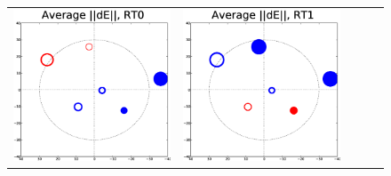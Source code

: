 \documentclass[]{aa}
\begin{document}

\begin{figure}
\centering
\begin{tabular}{@{}c@{}c@{}c@{}c@{}c@{}}
\includegraphics[width=\roguewidth]{o2003_dE_ant0} &
\includegraphics[width=\roguewidth]{o2003_dE_ant1} &

\end{tabular}
\end{figure}
\end{document}
